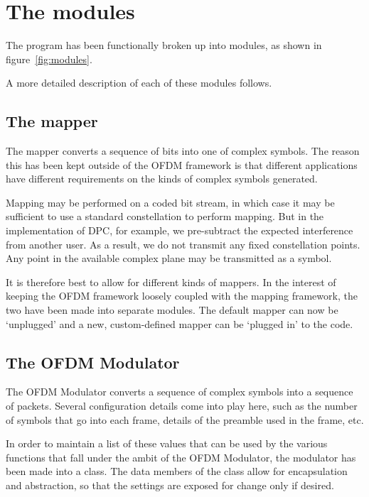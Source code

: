 \section{The modules}

The program has been functionally broken up into modules, as shown in
figure~\ref{fig:modules}.


A more detailed description of each of these modules follows.

\subsection{The mapper}

The mapper converts a sequence of bits into one of complex symbols. The reason
this has been kept outside of the OFDM framework is that different applications
have different requirements on the kinds of complex symbols generated.

Mapping may be performed on a coded bit stream, in which case it may be
sufficient to use a standard constellation to perform mapping. But in the
implementation of DPC, for example, we pre-subtract the expected interference
from another user. As a result, we do not transmit any fixed constellation
points. Any point in the available complex plane may be transmitted as a
symbol.

It is therefore best to allow for different kinds of mappers. In the interest
of keeping the OFDM framework loosely coupled with the mapping framework, the
two have been made into separate modules. The default mapper can now be
`unplugged' and a new, custom-defined mapper can be `plugged in' to the code.

\subsection{The OFDM Modulator}

The OFDM Modulator converts a sequence of complex symbols into a sequence of
packets. Several configuration details come into play here, such as the number
of symbols that go into each frame, details of the preamble used in the frame,
etc.

In order to maintain a list of these values that can be used by the various
functions that fall under the ambit of the OFDM Modulator, the modulator has
been made into a class. The data members of the class allow for encapsulation
and abstraction, so that the settings are exposed for change only if desired.

